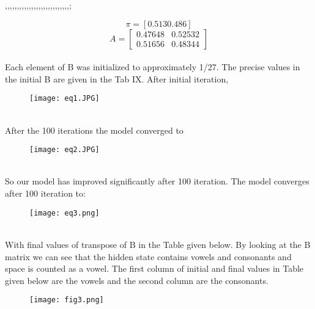 ,,,,,,,,,,,,,,,,,,,,,,,,,,,;\documentclass[conference]{IEEEtran}
\begin{document}
\begin{equation}
 \pi =  {[0.513 0.486]}
\end{equation}
\[
A=
  \begin{bmatrix}
    0.47648 & 0.52532 \\
    0.51656 & 0.48344 
  \end{bmatrix}
\]                                        
\\
 Each element of B was initialized to approximately 1/27.
The precise values in the initial B are given in the Tab IX.
After initial iteration,
\begin{figure}[htbp]
\centerline{\texttt{[image: eq1.JPG]}}
\label{fig}
\end{figure}
\\
After the 100 iterations the model converged to
\begin{figure}[htbp]
\centerline{\texttt{[image: eq2.JPG]}}

\label{fig}
\end{figure}
\\
So our model has improved significantly after 100 iteration. The model 
converges after 100 iteration to:
\\
\begin{figure}[htbp]
\centerline{\texttt{[image: eq3.png]}}

\label{fig}
\end{figure}
\\
With final values of transpose of B in the Table given below.
By looking at the B matrix we can see that the hidden state
contains vowels and consonants and space is counted as a
vowel. The first column of initial and final values in Table given
below are the vowels and the second column are the consonants.
\\
\begin{figure}[htbp]
\centerline{\texttt{[image: fig3.png]}}

\label{fig}
\end{figure}
\\
\end{document}
